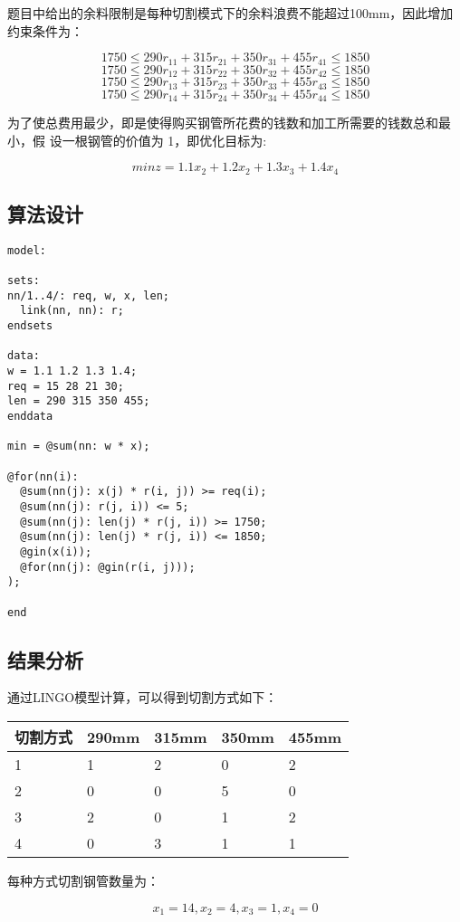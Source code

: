\documentclass{article}
\begin{document}
题目中给出的余料限制是每种切割模式下的余料浪费不能超过100mm，因此增加约束条件为：

$$1750\leq 290r_{11}+315r_{21}+350r_{31}+455r_{41}\leq1850$$
$$1750\leq 290r_{12}+315r_{22}+350r_{32}+455r_{42}\leq1850$$
$$1750\leq 290r_{13}+315r_{23}+350r_{33}+455r_{43}\leq1850$$
$$1750\leq 290r_{14}+315r_{24}+350r_{34}+455r_{44}\leq1850$$

为了使总费用最少，即是使得购买钢管所花费的钱数和加工所需要的钱数总和最小，假
设一根钢管的价值为 1，即优化目标为:

$$minz=1.1x_2+1.2x_2+1.3x_3+1.4x_4$$

\subsection{算法设计}

\begin{lstlisting}
model:

sets:
nn/1..4/: req, w, x, len;
  link(nn, nn): r;
endsets

data:
w = 1.1 1.2 1.3 1.4;
req = 15 28 21 30;
len = 290 315 350 455;
enddata

min = @sum(nn: w * x);

@for(nn(i):
  @sum(nn(j): x(j) * r(i, j)) >= req(i);
  @sum(nn(j): r(j, i)) <= 5;
  @sum(nn(j): len(j) * r(j, i)) >= 1750;
  @sum(nn(j): len(j) * r(j, i)) <= 1850;
  @gin(x(i));
  @for(nn(j): @gin(r(i, j)));
);

end
\end{lstlisting}

\subsection{结果分析}
通过LINGO模型计算，可以得到切割方式如下：
\begin{table}[H]
\centering
\begin{tabular}{|l|l|l|l|l|}
\hline
切割方式 & 290mm & 315mm & 350mm & 455mm \\ \hline
1    & 1     & 2     & 0     & 2     \\ \hline
2    & 0     & 0     & 5     & 0     \\ \hline
3    & 2     & 0     & 1     & 2     \\ \hline
4    & 0     & 3     & 1     & 1     \\ \hline
\end{tabular}
\end{table}
每种方式切割钢管数量为：

$$x_1=14,x_2=4,x_3=1,x_4=0$$
\end{document}

